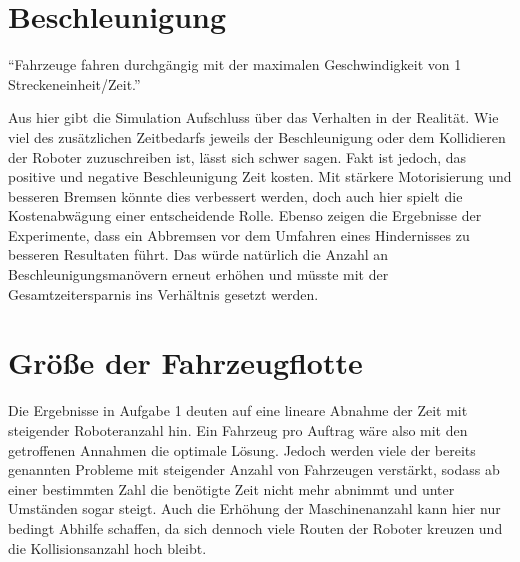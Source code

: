 \documentclass[ngerman]{tudscrreprt}
\begin{document}
\section{Beschleunigung}
\begin{displayquote}
    ``Fahrzeuge fahren durchgängig mit der maximalen Geschwindigkeit von 1 Streckeneinheit/Zeit.'' \cite{aufgabenstellung}
\end{displayquote}
%
Aus hier gibt die Simulation Aufschluss über das Verhalten in der Realität. Wie viel des zusätzlichen Zeitbedarfs jeweils der Beschleunigung oder dem Kollidieren der Roboter zuzuschreiben ist, lässt sich schwer sagen. Fakt ist jedoch, das positive und negative Beschleunigung Zeit kosten. Mit stärkere Motorisierung und besseren Bremsen könnte dies verbessert werden, doch auch hier spielt die Kostenabwägung einer entscheidende Rolle. Ebenso zeigen die Ergebnisse der Experimente, dass ein Abbremsen vor dem Umfahren eines Hindernisses zu besseren Resultaten führt. Das würde natürlich die Anzahl an Beschleunigungsmanövern erneut erhöhen und müsste mit der Gesamtzeitersparnis ins Verhältnis gesetzt werden.

\section{Größe der Fahrzeugflotte}
Die Ergebnisse in Aufgabe 1 deuten auf eine lineare Abnahme der Zeit mit steigender Roboteranzahl hin. Ein Fahrzeug pro Auftrag wäre also mit den getroffenen Annahmen die optimale Lösung. Jedoch werden viele der bereits genannten Probleme mit steigender Anzahl von Fahrzeugen verstärkt, sodass ab einer bestimmten Zahl die benötigte Zeit nicht mehr abnimmt und unter Umständen sogar steigt. Auch die Erhöhung der Maschinenanzahl kann hier nur bedingt Abhilfe schaffen, da sich dennoch viele Routen der Roboter kreuzen und die Kollisionsanzahl hoch bleibt.



\end{document}
